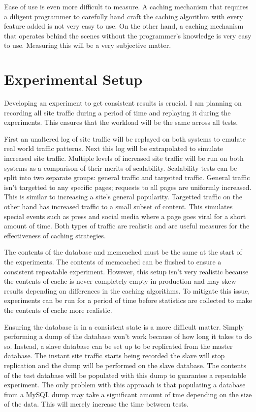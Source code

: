 \documentclass[12pt]{ucthesis}
\begin{document}
Ease of use is even more difficult to measure.
A caching mechanism that requires a diligent programmer to carefully hand craft the caching algorithm with every feature added is not very easy to use.
On the other hand, a caching mechanism that operates behind the scenes without the programmer's knowledge is very easy to use.
Measuring this will be a very subjective matter.

\section{Experimental Setup}
Developing an experiment to get consistent results is crucial.
I am planning on recording all site traffic during a period of time and replaying it during the experiments.
This ensures that the workload will be the same across all tests.

First an unaltered log of site traffic will be replayed on both systems to emulate real world traffic patterns.
Next this log will be extrapolated to simulate increased site traffic.
Multiple levels of increased site traffic will be run on both systems as a comparison of their merits of scalability.
Scalability tests can be split into two separate groups: general traffic and targetted traffic.
General traffic isn't targetted to any specific pages; requests to all pages are uniformly increased.
This is similar to increasing a site's general popularity.
Targetted traffic on the other hand has increased traffic to a small subset of content.
This simulates special events such as press and social media where a page goes viral for a short amount of time.
Both types of traffic are realistic and are useful measures for the effectiveness of caching strategies.

The contents of the database and memcached must be the same at the start of the experiments.
The contents of memcached can be flushed to ensure a consistent repeatable experiment.
However, this setup isn't very realistic because the contents of cache is never completely empty in production and may skew results depending on differences in the caching algorithms.
To mitigate this issue, experiments can be run for a period of time before statistics are collected to make the contents of cache more realistic.

Ensuring the database is in a consistent state is a more difficult matter.
Simply performing a dump of the database won't work because of how long it takes to do so.
Instead, a slave database can be set up to be replicated from the master database.
The instant site traffic starts being recorded the slave will stop replication and the dump will be performed on the slave database.
The contents of the test database will be populated with this dump to guarantee a repeatable experiment.
The only problem with this approach is that populating a database from a MySQL dump may take a significant amount of tme depending on the size of the data.
This will merely increase the time between tests.
\end{document}
